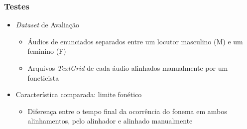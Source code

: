 \begin{frame}
    \frametitle{Testes}
    \begin{itemize}
        \item \textit{Dataset} de Avalia\c c\~ao
        \begin{itemize}
            \item \'Audios de enunciados separados entre um locutor masculino (M) e um feminino
                (F)
            \item Arquivos \textit{TextGrid} de cada \'audio alinhados
                manualmente por um foneticista
        \end{itemize}
        \item Caracter\'istica comparada: limite fon\'etico
        \begin{itemize}
            \item Diferen\c ca entre o tempo final da ocorr\^encia do fonema em ambos alinhamentos, pelo alinhador e alinhado manualmente
        \end{itemize}
    \end{itemize}
\end{frame}

